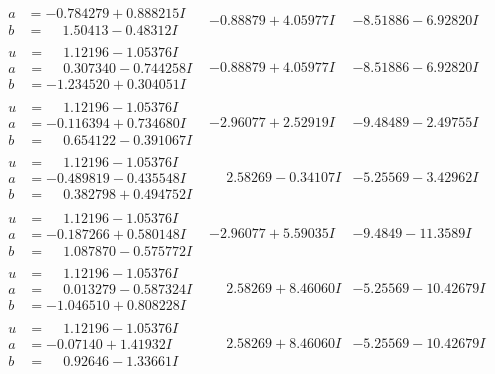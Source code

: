 \documentclass[1p]{elsarticle_modified}
\theoremstyle{definition}
\begin{document}
$$\begin{array}{c|c|c}
\begin{aligned}
a &= -0.784279 + 0.888215 I \\
b &= \phantom{-}1.50413 - 0.48312 I\end{aligned}
 & -0.88879 + 4.05977 I & -8.51886 - 6.92820 I \\ \hline\begin{aligned}
u &= \phantom{-}1.12196 - 1.05376 I \\
a &= \phantom{-}0.307340 - 0.744258 I \\
b &= -1.234520 + 0.304051 I\end{aligned}
 & -0.88879 + 4.05977 I & -8.51886 - 6.92820 I \\ \hline\begin{aligned}
u &= \phantom{-}1.12196 - 1.05376 I \\
a &= -0.116394 + 0.734680 I \\
b &= \phantom{-}0.654122 - 0.391067 I\end{aligned}
 & -2.96077 + 2.52919 I & -9.48489 - 2.49755 I \\ \hline\begin{aligned}
u &= \phantom{-}1.12196 - 1.05376 I \\
a &= -0.489819 - 0.435548 I \\
b &= \phantom{-}0.382798 + 0.494752 I\end{aligned}
 & \phantom{-}2.58269 - 0.34107 I & -5.25569 - 3.42962 I \\ \hline\begin{aligned}
u &= \phantom{-}1.12196 - 1.05376 I \\
a &= -0.187266 + 0.580148 I \\
b &= \phantom{-}1.087870 - 0.575772 I\end{aligned}
 & -2.96077 + 5.59035 I & -9.4849 - 11.3589 I \\ \hline\begin{aligned}
u &= \phantom{-}1.12196 - 1.05376 I \\
a &= \phantom{-}0.013279 - 0.587324 I \\
b &= -1.046510 + 0.808228 I\end{aligned}
 & \phantom{-}2.58269 + 8.46060 I & -5.25569 - 10.42679 I \\ \hline\begin{aligned}
u &= \phantom{-}1.12196 - 1.05376 I \\
a &= -0.07140 + 1.41932 I \\
b &= \phantom{-}0.92646 - 1.33661 I\end{aligned}
 & \phantom{-}2.58269 + 8.46060 I & -5.25569 - 10.42679 I \\ \hline\begin{aligned}

\end{aligned}
\end{array}$$
\end{document}
